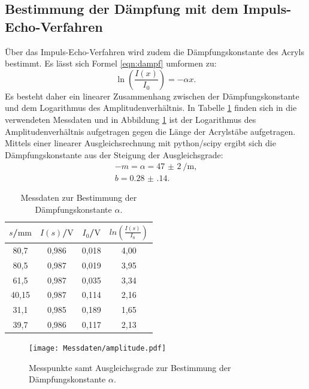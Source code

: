\subsection{Bestimmung der Dämpfung mit dem Impuls-Echo-Verfahren}
Über das Impuls-Echo-Verfahren wird zudem die Dämpfungskonstante des Acryls bestimmt.
Es lässt sich Formel \eqref{eqn:dampf} umformen zu:
\begin{equation}
  \ln{\left( \frac{I(x)}{I_0}\right)}=-\alpha x \text{.}
\end{equation}
Es besteht daher ein linearer Zusammenhang zwischen der Dämpfungskonstante und dem Logarithmus des Amplitudenverhältnis.
In Tabelle \ref{tab:daempf} finden sich in die verwendeten Messdaten und in Abbildung \ref{fig:daempf} ist der Logarithmus des Amplitudenverhältnis aufgetragen gegen die Länge der Acrylstäbe aufgetragen.
Mittels einer linearer Ausgleichsrechnung mit python/scipy \cite{scipy} ergibt sich die Dämpfungskonstante aus der Steigung der Ausgleichsgrade:
\begin{gather*}
-m=\alpha=\SI{47(2)}{\per\meter} \text{,}\\
b=  \num{0.28(14)}\text{.}
\end{gather*}


\begin{table}
\centering
\caption{Messdaten zur Bestimmung der Dämpfungskonstante $\alpha$.}
\label{tab:daempf}
\begin{tabular}{cccc}
  \toprule
$s$/$\si{\milli\meter}$ & $I(s)$/$\si{\volt}$ & $I_0$/$\si{\volt}$ & $ln\left(\frac{I(s)}{I_0}\right)$ \\
\midrule
80,7 & 0,986 & 0,018 & 4,00 \\
80,5 & 0,987 & 0,019 & 3,95 \\
61,5 & 0,987 & 0,035 & 3,34 \\
40,15 & 0,987 & 0,114 & 2,16 \\
31,1 & 0,985 & 0,189 & 1,65 \\
39,7 & 0,986 & 0,117 & 2,13 \\
\bottomrule
\end{tabular}
\end{table}

\begin{figure}
  \centering
  \texttt{[image: Messdaten/amplitude.pdf]}
  \caption{Messpunkte samt Ausgleichsgrade zur Bestimmung der Dämpfungskonstante $\alpha$.}
  \label{fig:daempf}
\end{figure}
\FloatBarrier
